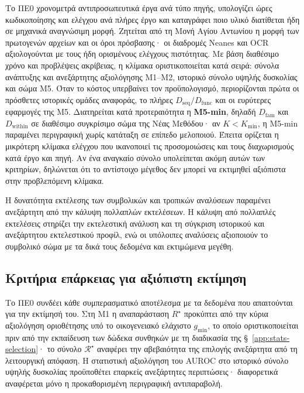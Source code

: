 \documentclass[11pt,a4paper]{article}
\begin{document}
Το ΠΕ0 χρονομετρά αντιπροσωπευτικά έργα ανά τύπο πηγής, υπολογίζει ώρες κωδικοποίησης και ελέγχου ανά πλήρες έργο και καταγράφει ποιο υλικό διατίθεται ήδη σε μηχανικά αναγνώσιμη μορφή. Ζητείται από τη Μονή Αγίου Αντωνίου η μορφή των πρωτογενών αρχείων και οι όροι πρόσβασης· οι διαδρομές Neanes και OCR αξιολογούνται με τους ήδη ορισμένους ελέγχους πιστότητας. Με βάση διαθέσιμο χρόνο και προβλέψεις ακρίβειας, η κλίμακα οριστικοποιείται κατά σειρά: σύνολα ανάπτυξης και ανεξάρτητης αξιολόγησης M1--M2, ιστορικό σύνολο υψηλής δυσκολίας και σώμα M5. Όταν το κόστος υπερβαίνει τον προϋπολογισμό, περιορίζονται πρώτα οι πρόσθετες ιστορικές ομάδες αναφοράς, το πλήρες $D_{\mathrm{seq}}/D_{\mathrm{func}}$ και οι ευρύτερες εφαρμογές της M5. Διατηρείται κατά προτεραιότητα η \textbf{M5-min}, δηλαδή $D_{\mathrm{fam}}$ και $D_{\mathrm{within}}$ σε διαθέσιμο συγκρίσιμο σώμα της Νέας Μεθόδου· αν $K<K_{\min}$, η M5-min παραμένει περιγραφική χωρίς κατάταξη σε επίπεδο μελοποιού. Έπειτα ορίζεται η μικρότερη κλίμακα ελέγχου που ικανοποιεί τις προσομοιώσεις και τους διαχωρισμούς κατά έργο και πηγή. Αν ένα αναγκαίο σύνολο υπολείπεται ακόμη αυτών των κριτηρίων, δηλώνεται ότι το αντίστοιχο μέγεθος δεν μπορεί να εκτιμηθεί αξιόπιστα στην προβλεπόμενη κλίμακα.\par

Η δυνατότητα εκτέλεσης των συμβολικών και τροπικών αναλύσεων παραμένει ανεξάρτητη από την κάλυψη πολλαπλών εκτελέσεων. Η κάλυψη από πολλαπλές εκτελέσεις στηρίζει την εκτελεστική ανάλυση και τη σύγκριση ιστορικού και ανεξάρτητου εκτελεστικού προφίλ, ενώ οι υπόλοιπες αναλύσεις αξιοποιούν το συμβολικό σώμα με τα δικά τους δεδομένα και εκτιμώμενα μεγέθη.

\subsection{Κριτήρια επάρκειας για αξιόπιστη εκτίμηση}\label{sec:estimability}

Το ΠΕ0 συνδέει κάθε συμπερασματικό αποτέλεσμα με τα δεδομένα που απαιτούνται για την εκτίμησή του. Στη M1 η αναπαράσταση $R^\star$ προκύπτει από την κύρια αξιολόγηση οριοθέτησης υπό το οικογενειακό ελάχιστο $g_{\min}$, το οποίο οριστικοποιείται πριν από την εκπαίδευση των δώδεκα συνθηκών με τη διαδικασία της §~\ref{app:stats-selection}· το σύνολο $\mathcal R^\star$ αναφέρει την αβεβαιότητα της επιλογής ανεξάρτητα από τη λειτουργική απόφαση. Η στατιστική αξιολόγηση του AUROC στο ιστορικό σύνολο υψηλής δυσκολίας προϋποθέτει επαρκείς ανεξάρτητες περιπτώσεις· διαφορετικά αναφέρεται μόνο η προκαθορισμένη περιγραφική αντιπαραβολή.
\end{document}
